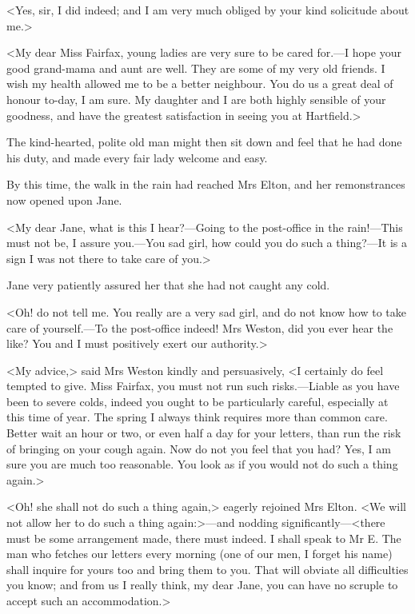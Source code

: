 <Yes, sir, I did indeed; and I am very much obliged by your kind solicitude about me.>

<My dear Miss Fairfax, young ladies are very sure to be cared for.—I hope your good grand-mama and aunt are well. They are some of my very old friends. I wish my health allowed me to be a better neighbour. You do us a great deal of honour to-day, I am sure. My daughter and I are both highly sensible of your goodness, and have the greatest satisfaction in seeing you at Hartfield.>

The kind-hearted, polite old man might then sit down and feel that he had done his duty, and made every fair lady welcome and easy.

By this time, the walk in the rain had reached Mrs Elton, and her remonstrances now opened upon Jane.

<My dear Jane, what is this I hear?—Going to the post-office in the rain!—This must not be, I assure you.—You sad girl, how could you do such a thing?—It is a sign I was not there to take care of you.>

Jane very patiently assured her that she had not caught any cold.

<Oh! do not tell me. You really are a very sad girl, and do not know how to take care of yourself.—To the post-office indeed! Mrs Weston, did you ever hear the like? You and I must positively exert our authority.>

<My advice,> said Mrs Weston kindly and persuasively, <I certainly do feel tempted to give. Miss Fairfax, you must not run such risks.—Liable as you have been to severe colds, indeed you ought to be particularly careful, especially at this time of year. The spring I always think requires more than common care. Better wait an hour or two, or even half a day for your letters, than run the risk of bringing on your cough again. Now do not you feel that you had? Yes, I am sure you are much too reasonable. You look as if you would not do such a thing again.>

<Oh! she shall not do such a thing again,> eagerly rejoined Mrs Elton. <We will not allow her to do such a thing again:>—and nodding significantly—<there must be some arrangement made, there must indeed. I shall speak to Mr E. The man who fetches our letters every morning (one of our men, I forget his name) shall inquire for yours too and bring them to you. That will obviate all difficulties you know; and from us I really think, my dear Jane, you can have no scruple to accept such an accommodation.>

